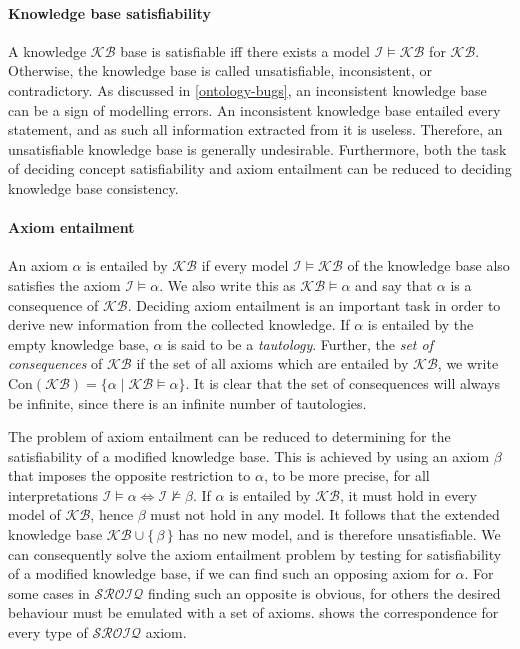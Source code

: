 \paragraph{Knowledge base satisfiability} \label{knowledge-base-satisfiability}

A knowledge $\mathcal{KB}$ base is satisfiable iff there exists a model $\mathcal{I} \vDash \mathcal{KB}$ for $\mathcal{KB}$. Otherwise, the knowledge base is called unsatisfiable, inconsistent, or contradictory. As discussed in \cref{ontology-bugs}, an inconsistent knowledge base can be a sign of modelling errors. An inconsistent knowledge base entailed every statement, and as such all information extracted from it is useless. Therefore, an unsatisfiable knowledge base is generally undesirable. Furthermore, both the task of deciding concept satisfiability and axiom entailment can be reduced to deciding knowledge base consistency.

\paragraph{Axiom entailment} \label{axiom-entailment}

An axiom $\alpha$ is entailed by $\mathcal{KB}$ if every model $\mathcal{I} \vDash \mathcal{KB}$ of the knowledge base also satisfies the axiom $\mathcal{I} \vDash \alpha$. We also write this as $\mathcal{KB} \vDash \alpha$ and say that $\alpha$ is a consequence of $\mathcal{KB}$. Deciding axiom entailment is an important task in order to derive new information from the collected knowledge. If $\alpha$ is entailed by the empty knowledge base, $\alpha$ is said to be a \emph{tautology}. Further, the \emph{set of consequences} of $\mathcal{KB}$ if the set of all axioms which are entailed by $\mathcal{KB}$, we write $\mathrm{Con}(\mathcal{KB}) = \{ \alpha \mid \mathcal{KB} \vDash \alpha \}.$ It is clear that the set of consequences will always be infinite, since there is an infinite number of tautologies.

The problem of axiom entailment can be reduced to determining for the satisfiability of a modified knowledge base. This is achieved by using an axiom $\beta$ that imposes the opposite restriction to $\alpha$, to be more precise, for all interpretations $\mathcal{I} \vDash \alpha \iff \mathcal{I} \not\vDash \beta$. If $\alpha$ is entailed by $\mathcal{KB}$, it must hold in every model of $\mathcal{KB}$, hence $\beta$ must not hold in any model. It follows that the extended knowledge base $\mathcal{KB} \cup \{ \, \beta \, \}$ has no new model, and is therefore unsatisfiable. We can consequently solve the axiom entailment problem by testing for satisfiability of a modified knowledge base, if we can find such an opposing axiom for $\alpha$. For some cases in $\mathcal{SROIQ}$ finding such an opposite is obvious, for others the desired behaviour must be emulated with a set of axioms.  shows the correspondence for every type of $\mathcal{SROIQ}$ axiom.

